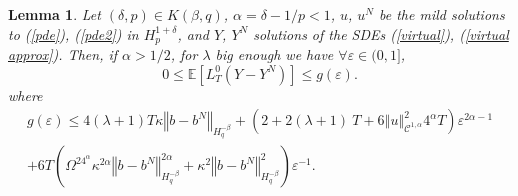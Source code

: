 \documentclass[11pt]{enstaPRE}
\newtheorem{lem}[theo]{Lemma}
\newcommand{\norme}[1]{\left\Vert #1\right\Vert}
\newcommand{\E}{\mathbb{E}}
\begin{document}
\begin{lem}\label{local time}
    Let $(\delta,p)\in K(\beta,q)$, $\alpha=\delta-1/p<1$, $u$, $u^N$ be the mild solutions to (\ref{pde}), (\ref{pde2}) in $H_p^{1+\delta}$, and $Y$, $Y^N$ solutions of the SDEs (\ref{virtual}), (\ref{virtual approx}).  Then, if $\alpha>1/2$, for $\lambda$ big enough we have $\forall\varepsilon\in(0,1]$,
    \begin{equation*}
    0\leq \E\left[L^0_T(Y-Y^N)\right]\leq  g(\varepsilon).
    \end{equation*}
    where \begin{multline*}
    g(\varepsilon) \leq 4(\lambda + 1)T\kappa\norme{b-b^N}_{H^{-\beta}_{q}} + \left(2 + 2(\lambda + 1)\ T + 6\norme{u}_{\mathcal{C}^{1,\alpha}}^2 4^{\alpha}T\right) \varepsilon^{2\alpha-1} \\ + 6T\left(\Omega^24^{\alpha}\kappa^{2\alpha} \norme{b-b^N}_{H^{-\beta}_q}^{2\alpha}+\kappa^2\norme{b-b^N}_{H^{-\beta}_{q}}^2\right)\varepsilon^{-1}.
    \end{multline*}
    
\end{lem}
\end{document}
